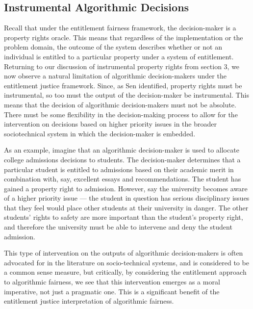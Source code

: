 \subsection{Instrumental Algorithmic Decisions}

Recall that under the entitlement fairness framework, the decision-maker is a
property rights oracle. This means that regardless of the implementation or the
problem domain, the outcome of the system describes whether or not an individual
is entitled to a particular property under a system of entitlement. Returning to
our discussion of instrumental property rights from section 3, we now observe 
a natural limitation of algorithmic decision-makers under the entitlement
justice framework. Since, as Sen identified, property rights must be
instrumental, so too must the output of the decision-maker be instrumental. This
means that the decision of algorithmic decision-makers must not be absolute.
There must be some flexibility in the decision-making process to allow for
the intervention on decisions based on higher priority issues in the broader
sociotechnical system in which the decision-maker is embedded. 

As an example, imagine that an algorithmic decision-maker is used to allocate
college admissions decisions to students. The decision-maker determines that a
particular student is entitled to admissions based on their academic merit in
combination with, say, excellent essays and recommendations. The student has 
gained a property right to admission. However, say the university becomes aware
of a higher priority issue — the student in question has serious disciplinary
issues that they feel would place other students at their university in danger.
The other students' rights to safety are more important than the student's
property right, and therefore the university must be able to intervene and deny
the student admission.

This type of intervention on the outputs of algorithmic decision-makers is often
advocated for in the literature on socio-technical systems, and is considered to
be a common sense measure, but critically, by considering the entitlement
approach to algorithmic fairness, we see that this intervention emerges as a
moral imperative, not just a pragmatic one. This is a significant benefit of
the entitlement justice interpretation of algorithmic fairness.
